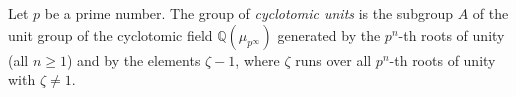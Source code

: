 Let $p$ be a prime number. The group of \emph{cyclotomic units} is the subgroup $A$ of the unit group of the cyclotomic field $\mathbb{Q}(\mu_{p^\infty})$ generated by the $p^n$-th roots of unity (all $n \geq 1$) and by the elements $\zeta - 1$, where $\zeta$ runs over all $p^n$-th roots of unity with $\zeta \neq 1$.
